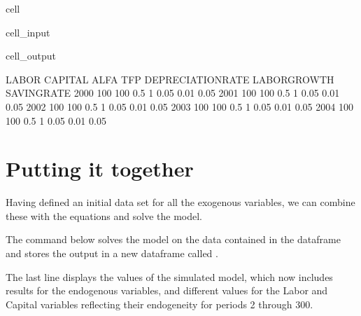 \documentclass[letterpaper,10pt,english]{jupyterBook}
\begin{document}
\begin{sphinxuseclass}{cell}
\begin{sphinxVerbatimInput}
\begin{sphinxuseclass}{cell_input}
\end{sphinxuseclass}\end{sphinxVerbatimInput}
\begin{sphinxVerbatimOutput}

\begin{sphinxuseclass}{cell_output}
\begin{sphinxVerbatim}[commandchars=\\\{\}]
      LABOR  CAPITAL  ALFA  TFP  DEPRECIATION\PYGZus{}RATE  LABOR\PYGZus{}GROWTH  SAVING\PYGZus{}RATE
2000    100      100   0.5    1               0.05          0.01         0.05
2001    100      100   0.5    1               0.05          0.01         0.05
2002    100      100   0.5    1               0.05          0.01         0.05
2003    100      100   0.5    1               0.05          0.01         0.05
2004    100      100   0.5    1               0.05          0.01         0.05
\end{sphinxVerbatim}

\end{sphinxuseclass}\end{sphinxVerbatimOutput}

\end{sphinxuseclass}

\section{Putting it together}
\label{\detokenize{content/03_Installation/TestingModelFlow:putting-it-together}}
\sphinxAtStartPar
Having defined an initial data set for all the exogenous variables, we can combine these with the equations and solve the model.

\sphinxAtStartPar
The command below solves the model  on the data contained in the dataframe  and stores the output in a new dataframe called .

\sphinxAtStartPar
The last line displays the values of the simulated model, which now includes results for the endogenous variables, and different values for the Labor and Capital variables reflecting their endogeneity for periods 2 through 300.
\end{document}
